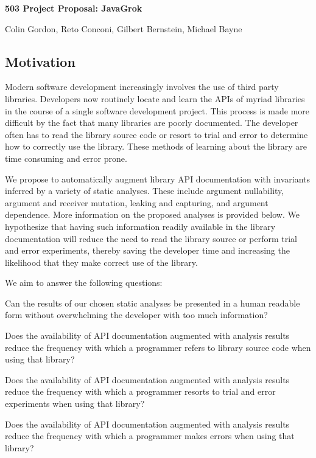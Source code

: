 \documentclass[letterpaper,12pt]{article}
\let\Itemize =\itemize
\def\Nospacing{\itemsep=0pt\topsep=0pt\partopsep=0pt\parskip=0pt\parsep=0pt}
\renewenvironment{itemize}{\Itemize\Nospacing}{\endlist}
\begin{document}
\centerline{\Large \bf 503 Project Proposal: JavaGrok}
\centerline{Colin Gordon, Reto Conconi, Gilbert Bernstein, Michael Bayne}
\bigskip
\small

\subsection*{Motivation}
Modern software development increasingly involves the use of third party
libraries. Developers now routinely locate and learn the APIs of myriad
libraries in the course of a single software development project. This process
is made more difficult by the fact that many libraries are poorly documented.
The developer often has to read the library source code or resort to trial and
error to determine how to correctly use the library. These methods of learning
about the library are time consuming and error prone.

We propose to automatically augment library API documentation with invariants
inferred by a variety of static analyses. These include argument nullability,
argument and receiver mutation, leaking and capturing, and argument
dependence. More information on the proposed analyses is provided below. We
hypothesize that having such information readily available in the library
documentation will reduce the need to read the library source or perform trial
and error experiments, thereby saving the developer time and increasing the
likelihood that they make correct use of the library.

We aim to answer the following questions:
\begin{itemize}
\item Can the results of our chosen static analyses be presented in a human
  readable form without overwhelming the developer with too much information?

\item Does the availability of API documentation augmented with analysis
  results reduce the frequency with which a programmer refers to library source
  code when using that library?

\item Does the availability of API documentation augmented with analysis
  results reduce the frequency with which a programmer resorts to trial and
  error experiments when using that library?

\item Does the availability of API documentation augmented with analysis
  results reduce the frequency with which a programmer makes errors when using
  that library?
\end{itemize}
\end{document}
